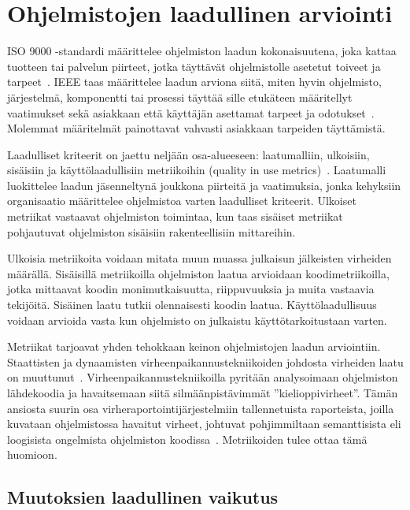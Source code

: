 \documentclass[finnish]{../tktltiki2}
\theoremstyle{definition}
\theoremstyle{remark}
\begin{document}
\section{Ohjelmistojen laadullinen arviointi}

ISO 9000 -standardi määrittelee ohjelmiston laadun kokonaisuutena, joka kattaa tuotteen tai palvelun piirteet, jotka 
täyttävät ohjelmistolle asetetut toiveet ja tarpeet~\cite{ISO9000}. IEEE taas määrittelee laadun arviona siitä, miten hyvin 
ohjelmisto, järjestelmä, komponentti tai prosessi täyttää sille etukäteen määritellyt vaatimukset sekä asiakkaan että 
käyttäjän asettamat tarpeet ja odotukset~\cite{IEEE1074}. Molemmat määritelmät painottavat vahvasti asiakkaan tarpeiden 
täyttämistä.

    Laadulliset kriteerit on jaettu neljään osa-alueeseen: laatumalliin, ulkoisiin, sisäisiin ja käyttölaadullisiin 
metriikoihin (quality in use metrics)~\cite{ISO25010}. Laatumalli luokittelee laadun jäsenneltynä joukkona piirteitä ja 
vaatimuksia, jonka kehyksiin organisaatio määrittelee ohjelmistoa varten laadulliset kriteerit. Ulkoiset metriikat 
vastaavat ohjelmiston toimintaa, kun taas sisäiset metriikat pohjautuvat ohjelmiston sisäisiin rakenteellisiin 
mittareihin.

    Ulkoisia metriikoita voidaan mitata muun muassa julkaisun jälkeisten virheiden määrällä. Sisäisillä metriikoilla 
ohjelmiston laatua arvioidaan koodimetriikoilla, jotka mittaavat koodin monimutkaisuutta, riippuvuuksia ja muita 
vastaavia tekijöitä. Sisäinen laatu tutkii olennaisesti koodin laatua. Käyttölaadullisuus voidaan arvioida vasta kun 
ohjelmisto on julkaistu käyttötarkoitustaan varten.

    Metriikat tarjoavat yhden tehokkaan keinon ohjelmistojen laadun arviointiin. Staattisten ja dynaamisten 
virheenpaikannustekniikoiden johdosta virheiden laatu on muuttunut~\cite{ZN08}. Virheenpaikannustekniikoilla pyritään 
analysoimaan ohjelmiston lähdekoodia ja havaitsemaan siitä silmäänpistävimmät ''kielioppivirheet''. Tämän ansiosta 
suurin osa virheraportointijärjestelmiin tallennetuista raporteista, joilla kuvataan ohjelmistossa havaitut virheet, 
johtuvat pohjimmiltaan semanttisista eli loogisista ongelmista ohjelmiston koodissa~\cite{ZN08}. Metriikoiden tulee 
ottaa tämä huomioon.

\subsection{Muutoksien laadullinen vaikutus}
\end{document}
